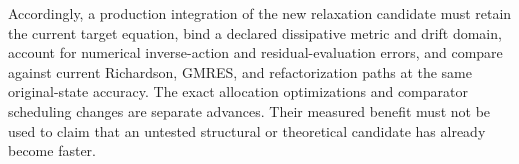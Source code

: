 Accordingly, a production integration of the new relaxation candidate must
retain the current target equation, bind a declared dissipative metric and
drift domain, account for numerical inverse-action and residual-evaluation
errors, and compare against current Richardson, GMRES, and refactorization
paths at the same original-state accuracy.  The exact allocation optimizations
and comparator scheduling changes are separate advances.  Their measured
benefit must not be used to claim that an untested structural or theoretical
candidate has already become faster.
